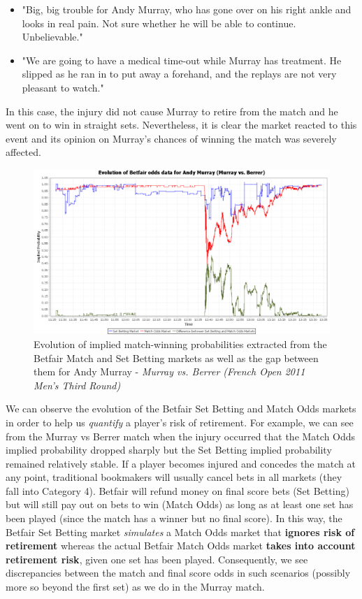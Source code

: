 \documentclass[letterpaper,12pt]{article}
\begin{document}
\begin{itemize}
	\item "Big, big trouble for Andy Murray, who has gone over on his right ankle and looks in real pain. Not sure whether he will be able to continue. Unbelievable."
	\item "We are going to have a medical time-out while Murray has treatment. He slipped as he ran in to put away a forehand, and the replays are not very pleasant to watch."
\end{itemize}

In this case, the injury did not cause Murray to retire from the match and he went on to win in straight sets.  Nevertheless, it is clear the market reacted to this event and its opinion on Murray's chances of winning the match was severely affected.

\begin{figure}[h!]
  \centering \includegraphics[width=12.5cm]{matches/murrayberrer}
  \caption{Evolution of implied match-winning probabilities extracted from the Betfair Match and Set Betting markets as well as the gap between them for Andy Murray - \textit{Murray vs. Berrer (French Open 2011 Men's Third Round)}}
  \label{murrayberrer}
\end{figure}

We can observe the evolution of the Betfair Set Betting and Match Odds markets in order to help us \textit{quantify} a player's risk of retirement.  For example, we can see from the Murray vs Berrer match when the injury occurred that the Match Odds implied probability dropped sharply but the Set Betting implied probability remained relatively stable.  If a player becomes injured and concedes the match at any point, traditional bookmakers will usually cancel bets in all markets (they fall into Category 4).  Betfair will refund money on final score bets (Set Betting) but will still pay out on bets to win (Match Odds) as long as at least one set has been played (since the match has a winner but no final score).  In this way, the Betfair Set Betting market \textit{simulates} a Match Odds market that \textbf{ignores risk of retirement} whereas the actual Betfair Match Odds market \textbf{takes into account retirement risk}, given one set has been played.  Consequently, we see discrepancies between the match and final score odds in such scenarios (possibly more so beyond the first set) as we do in the Murray match.
\end{document}
